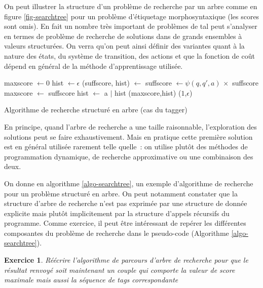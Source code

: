 \documentclass[11pt,openany]{book}
\newtheorem{exo}{Exercice}[chapter]
\newcommand{\ac}[1]{{\sc #1}} %
\begin{document}
On peut illustrer la  structure d'un problème de recherche par un arbre comme en figure \ref{fig-searchtree} pour un problème d'étiquetage morphosyntaxique (les scores sont omis). En fait un nombre très important de problèmes de \ac{tal} peut s'analyser en termes de problème de recherche de solutions dans de grands ensembles à valeurs structurées. On verra qu'on peut ainsi définir des variantes quant à la nature des états, du système de transition, des actions et que la fonction de coût dépend en général de la méthode d'apprentissage utilisée. 
\begin{algorithm}[htbp]
\begin{algorithmic}[1]
\State maxscore $\gets 0$
\State hist $\gets \epsilon$
\State  (suffscore, hist) $\gets$ 
\State suffscore $\gets \psi(q,q',a) \,\times$ suffscore
\State maxscore $\gets$ suffscore
\State hist $\gets$ a $|$ hist 
\EndIf
\EndFor
\State\Return (maxscore,hist)
\Else
  \State\Return ($1$,$\epsilon$)
\EndIf
\EndFunction
\end{algorithmic}
\caption{\label{algo-searchtree}Algorithme de recherche structuré en arbre (cas du tagger)}
\end{algorithm}
En principe, quand l'arbre de recherche a une taille raisonnable, l'exploration des solutions peut se faire exhaustivement.  Mais en pratique cette première solution est en général utilisée rarement telle quelle~: on utilise plutôt des méthodes de programmation dynamique, de recherche approximative ou une combinaison des deux.

On  donne en algorithme \ref{algo-searchtree},
un exemple d'algorithme de recherche pour un problème structuré en arbre. On peut notamment constater que la structure d'arbre de recherche n'est pas exprimée par une structure de donnée explicite mais plutôt implicitement par la structure d'appels récursifs du programme. Comme exercice, il peut être intéressant de repérer les différentes composantes du problème de recherche dans le pseudo-code  (Algorithme \ref{algo-searchtree}).



\begin{exo}Réécrire l'algorithme de parcours d'arbre de recherche
pour que le résultat renvoyé soit maintenant un couple qui comporte la valeur de score maximale mais aussi la séquence de tags correspondante
\end{exo}
\end{document}
